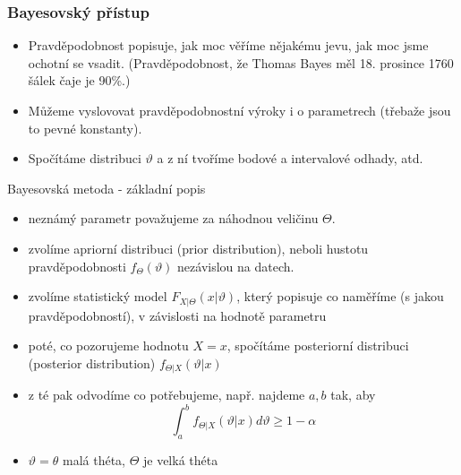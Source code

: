 \documentclass[../main.tex]{subfiles}
\begin{document}
\subsubsection{Bayesovský přístup}
\begin{itemize}
    \item Pravděpodobnost popisuje, jak moc věříme nějakému jevu, jak moc jsme ochotní se vsadit. (Pravděpodobnost, že Thomas Bayes měl 18. prosince 1760 šálek čaje je 90\%.)
    \item Můžeme vyslovovat pravděpodobnostní výroky i o parametrech (třebaže jsou to pevné konstanty).
    \item Spočítáme distribuci $\vartheta$ a z ní tvoříme bodové a intervalové odhady, atd.
\end{itemize}
Bayesovská metoda - základní popis
\begin{itemize}
    \item neznámý parametr považujeme za náhodnou veličinu $\Theta$.
    \item zvolíme apriorní distribuci (prior distribution), neboli hustotu pravděpodobnosti $f_{\Theta}(\vartheta)$ nezávislou na datech.
    \item zvolíme statistický model $F_{X|\Theta}(x|\vartheta)$, který popisuje co naměříme (s jakou pravděpodobností), v závislosti na hodnotě parametru
    \item poté, co pozorujeme hodnotu $X = x$, spočítáme posteriorní distribuci (posterior distribution) $f_{\Theta|X}(\vartheta|x)$
    \item z té pak odvodíme co potřebujeme, např. najdeme $a,b$ tak, aby 
    \[\int^b_a f_{\Theta|X}(\vartheta|x)d\vartheta \geq 1 - \alpha\]
    \item $\vartheta = \theta$ malá théta, $\Theta$ je velká théta 
\end{itemize}
\end{document}
